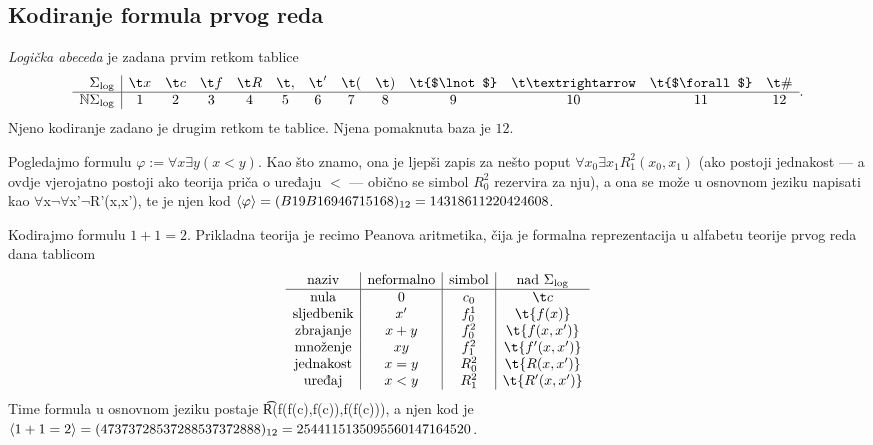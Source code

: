 \subsection{Kodiranje formula prvog reda}

\begin{definicija}[{name=[logička abeceda i njeno kodiranje]}]
\emph{Logička abeceda} je zadana prvim retkom tablice
\begin{equation}
    \begin{array}{r|cccccccccccc}
        \Sigma_{\log}& \t x & \t c & \t f & \t R & \t, & \t' & \t( & \t) & \t{$\lnot$} & \t\textrightarrow & \t{$\forall$} & \t\# \\\hline
         \N\Sigma_{\log}& 1 & 2 & 3 & 4 & 5 & 6 & 7 & 8 & 9 & 10 & 11 & 12
    \end{array}\text.
\end{equation}
Njeno kodiranje zadano je drugim retkom te tablice. Njena pomaknuta baza je $12$. \end{definicija}

\begin{primjer}[{name=[kodiranje formule "ne postoji najveći element"]}]
Pogledajmo formulu $\varphi:=\forall x\exists y(x<y)$. Kao što znamo, ona je ljepši zapis za nešto poput $\forall x_0\exists x_1 R_1^2(x_0,x_1)$ (ako postoji jednakost --- a ovdje vjerojatno postoji ako teorija priča o uređaju $<$ --- obično se simbol $R_0^2$ rezervira za nju), a ona se može u osnovnom jeziku napisati kao \t{$\forall$x$\lnot\forall$x'$\lnot$R'(x,x')}, te je njen kod $\langle\varphi\rangle=(B19B16946715168)_{12}=14318611220424608$.
\end{primjer}

\begin{primjer}[{name=[kodiranje jednostavne aritmetičke formule]}]
Kodirajmo formulu $1+1=2$. Prikladna teorija je recimo Peanova aritmetika, čija je formalna reprezentacija u alfabetu teorije prvog reda dana tablicom
\begin{equation}
    \begin{array}{c|c|c|c}
        \text{naziv}&\text{neformalno}&\text{simbol}&\text{nad }\Sigma_{\log}\\\hline
        \text{nula} & 0 & c_0 & \t c\\
        \text{sljedbenik} & x' & f_0^1 & \t{f(x)} \\ 
        \text{zbrajanje} & x+y & f_0^2 & \t{f(x,x')}\\
        \text{množenje} & xy & f_1^2 & \t{f'(x,x')}\\
        \text{jednakost} & x=y & R_0^2 & \t{R(x,x')}\\
        \text{uređaj} & x<y & R_1^2 & \t{R'(x,x')}
    \end{array}
\end{equation}
Time formula u osnovnom jeziku postaje \t{R(f(f(c),f(c)),f(f(c)))}, a njen kod je $\langle1+1=2\rangle=(47373728537288537372888)_{12}=2544115135095560147164520$.
\end{primjer}

